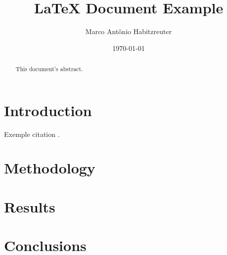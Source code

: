 \documentclass[12pt]{article}
\title{\LaTeX{} Document Example}
\author{Marco Antônio Habitzreuter}
\date{\today}
\begin{document}
\maketitle

\begin{abstract}
This document's abstract.
\end{abstract}

\section{Introduction}
Exemple citation \cite{debenedetti_supercooled_2003}.

\section{Methodology}
\lipsum

\section{Results}
\lipsum

\section{Conclusions}
\lipsum



\end{document}
